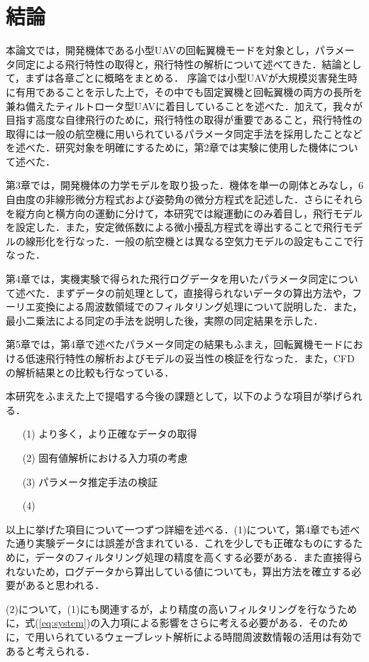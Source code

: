 
\chapter{結論}
\label{conclusion}

本論文では，開発機体である小型UAVの回転翼機モードを対象とし，パラメータ同定による飛行特性の取得と，飛行特性の解析について述べてきた．結論として，まずは各章ごとに概略をまとめる．
序論では小型UAVが大規模災害発生時に有用であることを示した上で，その中でも固定翼機と回転翼機の両方の長所を兼ね備えたティルトロータ型UAVに着目していることを述べた．加えて，我々が目指す高度な自律飛行のために，飛行特性の取得が重要であること，飛行特性の取得には一般の航空機に用いられているパラメータ同定手法を採用したことなどを述べた．研究対象を明確にするために，第2章では実験に使用した機体について述べた．

第3章では，開発機体の力学モデルを取り扱った．機体を単一の剛体とみなし，6自由度の非線形微分方程式および姿勢角の微分方程式を記述した．さらにそれらを縦方向と横方向の運動に分けて，本研究では縦運動にのみ着目し，飛行モデルを設定した．また，安定微係数による微小擾乱方程式を導出することで飛行モデルの線形化を行なった．一般の航空機とは異なる空気力モデルの設定もここで行なった．

第4章では，実機実験で得られた飛行ログデータを用いたパラメータ同定について述べた．まずデータの前処理として，直接得られないデータの算出方法や，フーリエ変換による周波数領域でのフィルタリング処理について説明した．また，最小二乗法による同定の手法を説明した後，実際の同定結果を示した．

第5章では，第4章で述べたパラメータ同定の結果もふまえ，回転翼機モードにおける低速飛行特性の解析およびモデルの妥当性の検証を行なった．また，CFDの解析結果との比較も行なっている．

\vspace{5pt}

本研究をふまえた上で提唱する今後の課題として，以下のような項目が挙げられる．
\begin{itemize}
  \item[(1)] より多く，より正確なデータの取得
  \item[(2)] 固有値解析における入力項の考慮
  \item[(3)] パラメータ推定手法の検証
  \item[(4)]
\end{itemize}

以上に挙げた項目について一つずつ詳細を述べる．(1)について，第4章でも述べた通り実験データには誤差が含まれている．これを少しでも正確なものにするために，データのフィルタリング処理の精度を高くする必要がある．また直接得られないため，ログデータから算出している値についても，算出方法を確立する必要があると思われる．

(2)について，(1)にも関連するが，より精度の高いフィルタリングを行なうために，式(\ref{eq:system})の入力項による影響をさらに考える必要がある．そのために，\cite{narioka}で用いられているウェーブレット解析による時間周波数情報の活用は有効であると考えられる．
